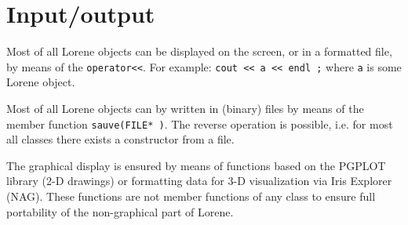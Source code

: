 \documentclass[12pt]{article}
\begin{document}
\section{Input/output}

Most of all {\sc Lorene} objects can be displayed on the
screen, or in a formatted file, by means of the {\tt operator<<}.
For example: {\tt cout << a << endl ;} where {\tt a} is some
{\sc Lorene} object.


Most of all {\sc Lorene} objects can by written in (binary) files
by means of the member function {\tt sauve(FILE* )}.
The reverse operation is possible, i.e. for most all classes
there exists a constructor from a file.

The graphical display is ensured by means of functions
based on the PGPLOT library (2-D drawings) or
formatting data for 3-D visualization via Iris Explorer (NAG).
These functions are not member functions of any class
to ensure full portability of the non-graphical part of
{\sc Lorene}.
\end{document}
